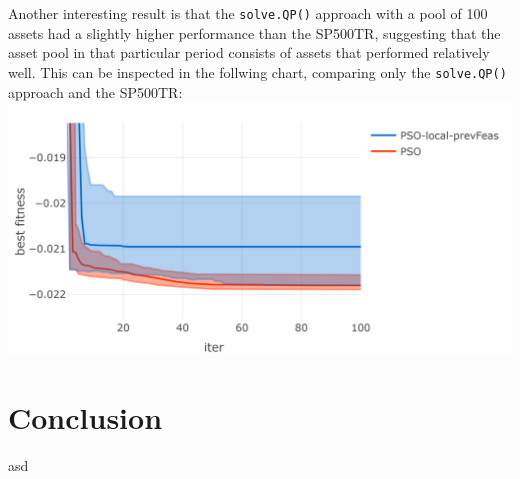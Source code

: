 \documentclass[
  oneside]{book}
\begin{document}
Another interesting result is that the \texttt{solve.QP()} approach with a pool of 100 assets had a slightly higher performance than the SP500TR, suggesting that the asset pool in that particular period consists of assets that performed relatively well. This can be inspected in the follwing chart, comparing only the \texttt{solve.QP()} approach and the SP500TR:
\includegraphics{Master_Thesis_files/figure-latex/unnamed-chunk-14-1.png}

\hypertarget{conclusion}{%
\chapter{Conclusion}\label{conclusion}}

asd

  
\end{document}
